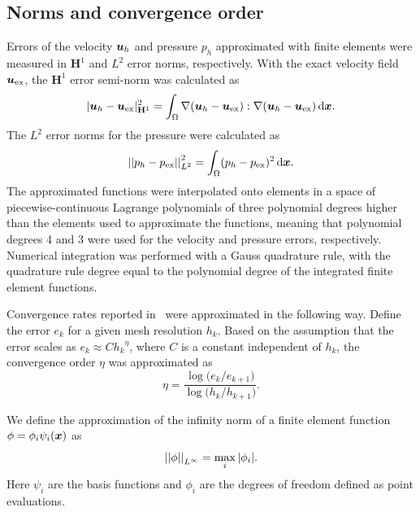 \documentclass{WileyMSP-template}
\begin{document}
\subsection{Norms and convergence order}\label{subsec:norms_and_eoc}
Errors of the velocity $\bm{u}_h$ and pressure $p_h$ approximated with finite elements
were measured in $\mathbf{H}^1$ and $L^2$ error norms, respectively.
With the exact velocity field $\bm{u}_{\mathrm{ex}}$, the $\mathbf{H}^1$
error semi-norm was calculated as
\begin{equation*}
    \vert\bm{u}_h - \bm{u}_{\mathrm{ex}}\vert_{\mathbf{H}^1}^2
    = \int_{\Omega}\nabla(\bm{u}_h - \bm{u}_{\mathrm{ex}}) : \nabla(\bm{u}_h - \bm{u}_{\mathrm{ex}}) \, \mathrm d\bm{x}.
\end{equation*}
The $L^2$ error norms for the pressure were calculated as
\begin{equation*}
    {\vert\vert p_h - p_{\mathrm{ex}}\vert\vert}_{L^2}^2 = \int_{\Omega}(p_h - p_{\mathrm{ex}})^2 \, \mathrm d\bm{x}.
\end{equation*}
The approximated functions were interpolated onto elements in a space of piecewise-continuous
Lagrange polynomials of three polynomial degrees higher than the elements used to approximate
the functions, meaning that polynomial degrees 4 and 3 were used for the velocity and pressure
errors, respectively. Numerical integration was performed with a Gauss quadrature rule,
with the quadrature rule degree equal to the polynomial degree of the integrated
finite element functions. 

Convergence rates reported in~ were
approximated in the following way. Define the error $e_k$ for a given mesh
resolution $h_k$. Based on the assumption that the error scales as
$e_k \approx C{h_k}^\eta$, where $C$ is a constant independent of $h_k$,
the convergence order $\eta$ was approximated as
\begin{equation}
    \eta = \frac{\log{(e_k/e_{k+1}})}{\log{(h_k/h_{k+1}})}.
    \label{eq:convergence_order_estimate}
\end{equation}

We define the approximation of the infinity norm of a finite element function
$\phi = \phi_i\psi_i(\bm{x})$
as 
\begin{equation*}
    {\vert\vert\phi\vert\vert}_{L^{\infty}} = \max_i{\vert \phi_i\vert}.
\end{equation*}
Here $\psi_i$ are the basis functions and $\phi_i$ are the degrees of freedom defined as point evaluations.
\end{document}
